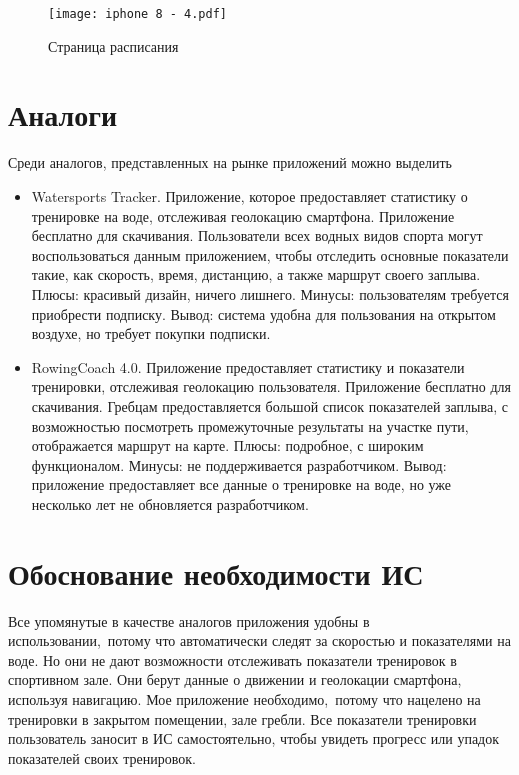 \documentclass[14pt]{extreport}
\begin{document}
\begin{figure}[H]
\centerline{\texttt{[image: iphone 8 - 4.pdf]}}
\caption{Страница расписания}
\label{fig14}
\end{figure}

\section{Аналоги}

Среди аналогов, представленных на рынке приложений можно выделить

\begin{itemize}
\item Watersports Tracker. Приложение, которое предоставляет статистику о тренировке на воде, отслеживая геолокацию смартфона. Приложение бесплатно для скачивания. Пользователи всех водных видов спорта могут воспользоваться данным приложением, чтобы отследить основные показатели такие, как скорость, время, дистанцию, а также маршрут своего заплыва. Плюсы: красивый дизайн, ничего лишнего. Минусы: пользователям требуется приобрести подписку. Вывод: система удобна для пользования на открытом воздухе, но требует покупки подписки.
\item RowingCoach 4.0. Приложение предоставляет статистику и показатели тренировки, отслеживая геолокацию пользователя. Приложение бесплатно для скачивания. Гребцам предоставляется большой список показателей заплыва, с возможностью посмотреть промежуточные результаты на участке пути, отображается маршрут на карте. Плюсы: подробное, с широким функционалом. Минусы: не поддерживается разработчиком. Вывод: приложение предоставляет все данные о тренировке на воде, но уже несколько лет не обновляется разработчиком.
\end{itemize}

\section{Обоснование необходимости ИС}

Все упомянутые в качестве аналогов приложения удобны в использовании, потому что автоматически следят за скоростью и показателями на воде. Но они не дают возможности отслеживать показатели тренировок в спортивном зале. Они берут данные о движении и геолокации смартфона, используя навигацию. Мое приложение необходимо, потому что нацелено на тренировки в закрытом помещении, зале гребли. Все показатели тренировки пользователь заносит в ИС самостоятельно, чтобы увидеть прогресс или упадок показателей своих тренировок.
 
\end{document}
